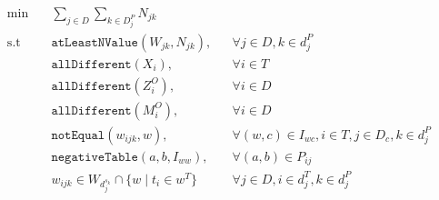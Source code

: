 \documentclass[../../thesis.tex]{subfiles}
\begin{document}
\begin{align}
  \textrm{min} \quad & \sum_{j \in D} \sum_{k \in D^P_j} N_{jk} &  \\ 
  \textrm{s.t} \quad & \texttt{atLeastNValue}(W_{jk}, N_{jk}), && \forall j \in D, k \in d^P_j \\
                     & \texttt{allDifferent}(X_i), && \forall i \in T \\
                     & \texttt{allDifferent}(Z^O_i), && \forall i \in D \\
                     & \texttt{allDifferent}(M^O_i), && \forall i \in D \\ 
                     & \texttt{notEqual}(w_{ijk}, w), && \forall (w, c) \in I_{wc}, i \in T, j \in D_c, k \in d^P_j \\ 
                     & \texttt{negativeTable}(a, b, I_{ww}), && \forall (a, b) \in P_{ij} \\ 
                     & w_{ijk} \in W_{d^{s_k}_j} \cap \{ w \mid t_i \in w^T \} && \forall j \in D, i \in d^T_j, k \in d^P_j 
\end{align}
\end{document}
